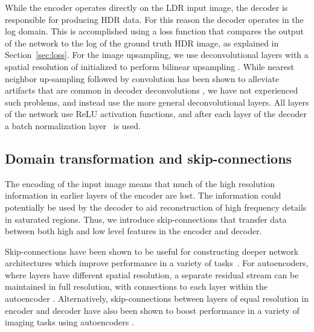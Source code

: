 \documentclass[acmtog]{acmart}
\newcommand{\secref}[1]{Section~\ref{sec:#1}}
\begin{document}
While the encoder operates directly on the LDR input image, the decoder is responsible for producing HDR data.
For this reason the decoder operates in the log domain. This is accomplished using a loss function that compares the output of the network to the log of the ground truth HDR image, as explained in \secref{loss}. For the image upsampling, we use deconvolutional layers with a spatial resolution of  initialized to perform  bilinear upsampling \cite{Long2015}. While nearest neighbor up-sampling followed by convolution has been shown to alleviate artifacts that are common in decoder deconvolutions \cite{Odena2016}, we have not experienced such problems, and instead use the more general deconvolutional layers.
All layers of the network use ReLU activation functions, and after each layer of the decoder a batch normalization layer~\cite{ioffe2015batch} is used.

\subsection{Domain transformation and skip-connections}
The encoding of the input image means that much of the high resolution information in earlier layers of the encoder are lost.
The information could potentially be used by the decoder to aid reconstruction of high frequency details in saturated regions.
Thus, we introduce skip-connections that transfer data between both high and low level features in the encoder and decoder. 

Skip-connections have been shown to be useful for constructing deeper network architectures which improve performance in a variety of tasks~\cite{He2016}. For autoencoders, where layers have different spatial resolution, a separate residual stream can be maintained in full resolution, with connections to each layer within the autoencoder \cite{Pohlen2016}. Alternatively, skip-connections between layers of equal resolution in encoder and decoder have also been shown to boost performance in a variety of imaging tasks using autoencoders \cite{Ronneberger2015,Zhang2017}.
\end{document}
